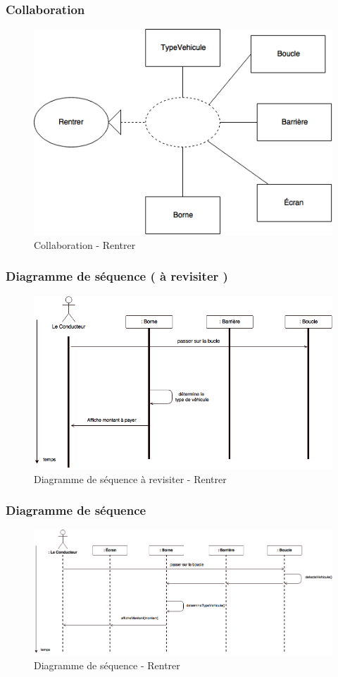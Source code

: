 \subsubsection{Collaboration}
\begin{figure}[!htb]
    \centering
    \includegraphics[scale=0.7]{02_Desenvolvimento/TD2/images/ColaRentrer.png}
    \caption{Collaboration - Rentrer}
    \label{fig:DARentrer}
\end{figure}
\newpage
\subsubsection{Diagramme de séquence ( à revisiter )}
\begin{figure}[!htb]
    \centering
    \includegraphics[scale=0.5]{02_Desenvolvimento/TD2/images/DSRentrer.png}
    \caption{Diagramme de séquence à revisiter  - Rentrer}
    \label{fig:DARentrer}
\end{figure}
\subsubsection{Diagramme de séquence}
\begin{figure}[!htb]
    \centering
    \includegraphics[scale=0.5]{02_Desenvolvimento/TD2/images/v2-DSRentrer.png}
    \caption{Diagramme de séquence - Rentrer}
    \label{fig:DARentrer}
\end{figure}